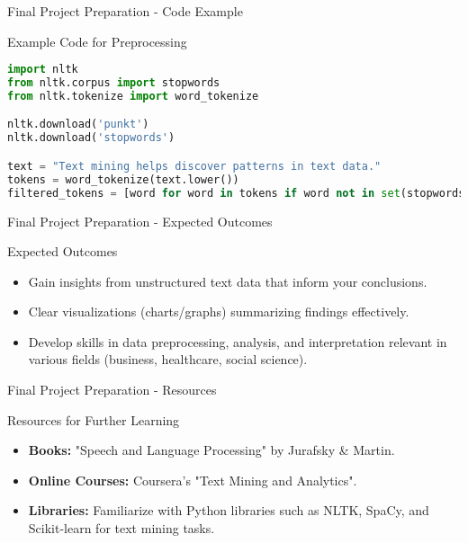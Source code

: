 \documentclass[aspectratio=169]{beamer}
\begin{document}
\begin{frame}[fragile]{Final Project Preparation - Code Example}
    \begin{block}{Example Code for Preprocessing}
        \begin{lstlisting}[language=Python]
import nltk
from nltk.corpus import stopwords
from nltk.tokenize import word_tokenize

nltk.download('punkt')
nltk.download('stopwords')

text = "Text mining helps discover patterns in text data."
tokens = word_tokenize(text.lower())
filtered_tokens = [word for word in tokens if word not in set(stopwords.words('english'))]
        \end{lstlisting}
    \end{block}
\end{frame}

\begin{frame}[fragile]{Final Project Preparation - Expected Outcomes}
    \begin{block}{Expected Outcomes}
        \begin{itemize}
            \item Gain insights from unstructured text data that inform your conclusions.
            \item Clear visualizations (charts/graphs) summarizing findings effectively.
            \item Develop skills in data preprocessing, analysis, and interpretation relevant in various fields (business, healthcare, social science).
        \end{itemize}
    \end{block}
\end{frame}

\begin{frame}[fragile]{Final Project Preparation - Resources}
    \begin{block}{Resources for Further Learning}
        \begin{itemize}
            \item \textbf{Books:} "Speech and Language Processing" by Jurafsky \& Martin.
            \item \textbf{Online Courses:} Coursera's "Text Mining and Analytics".
            \item \textbf{Libraries:} Familiarize with Python libraries such as NLTK, SpaCy, and Scikit-learn for text mining tasks.
        \end{itemize}
    \end{block}
\end{frame}
\end{document}
